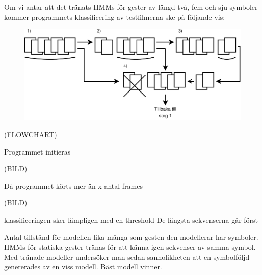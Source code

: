 \documentclass[../rapport_MVEX01-11-05]{subfiles}
\begin{document}

Om vi antar att det tränats HMMs för gester av längd två, fem och sju symboler kommer programmets 
klassificering av testfilmerna ske på följande vis:
 
 
 

\begin{figure}[tbp]
  \centering
  \includegraphics[width=\textwidth]{bilder/HMM_flowchart}
  \caption{}
  \label{fig:hmm-flowchart}
\end{figure}
 
(FLOWCHART)

Programmet initieras

(BILD)

Då programmet körts mer än x antal frames

(BILD)

klassificeringen sker lämpligen med en threshold 
De längsta sekvenserna går först


Antal tillstånd för modellen lika många som gesten den modellerar har symboler.
HMMs för statiska gester tränas för att känna igen sekvenser av samma symbol.
Med tränade modeller undersöker man sedan sannolikheten att en symbolföljd genererades av en viss modell.
Bäst modell vinner.

 
\end{document}
